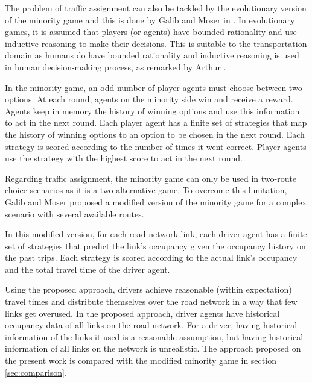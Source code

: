 \documentclass{RITA}
\begin{document}
The problem of traffic assignment can also be tackled by the evolutionary version of the minority game \cite{Challet&Zhang1997} and this is done by Galib and Moser in \cite{Galib&Moser2011}. In evolutionary games, it is assumed that players (or agents) have bounded rationality and use inductive reasoning to make their decisions. This is suitable to the transportation domain as humans do have bounded rationality and inductive reasoning is used in human decision-making process, as remarked by Arthur \cite{Arthur1994}.

In the minority game, an odd number of player agents must choose between two options. At each round, agents on the minority side win and receive a reward. Agents keep in memory the history of winning options and use this information to act in the next round. Each player agent has a finite set of strategies that map the history of winning options to an option to be chosen in the next round. Each strategy is scored according to the number of times it went correct. Player agents use the strategy with the highest score to act in the next round.

Regarding traffic assignment, the minority game can only be used in two-route choice scenarios as it is a two-alternative game. To overcome this limitation, Galib and Moser \cite{Galib&Moser2011} proposed a modified version of the minority game for a complex scenario with several available routes. 

In this modified version, for each road network link, each driver agent has a finite set of strategies that predict the link's occupancy given the occupancy history on the past trips. Each strategy is scored according to the actual link's occupancy and the total travel time of the driver agent.

Using the proposed approach, drivers achieve reasonable (within expectation) travel times and distribute themselves over the road network in a way that few links get overused. In the proposed approach, driver agents have historical occupancy data of all links on the road network. For a driver, having historical information of the links it used is a reasonable assumption, but having historical information of all links on the network is unrealistic. The approach proposed on the present work is compared with the modified minority game in section \ref{sec:comparison}. 
\end{document}
